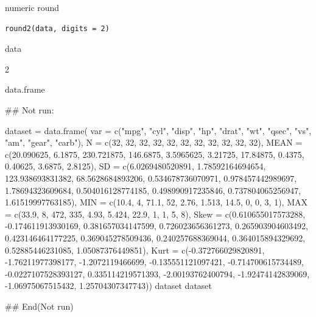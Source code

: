 \documentclass[a4paper]{book}
\begin{document}
%
\begin{Description}
numeric round
\end{Description}
%
\begin{Usage}
\begin{verbatim}
round2(data, digits = 2)
\end{verbatim}
\end{Usage}
%
\begin{Arguments}
\begin{ldescription}
\item[\code{data}] data

\item[\code{digits}] 2
\end{ldescription}
\end{Arguments}
%
\begin{Value}
data.frame
\end{Value}
%
\begin{Examples}
\begin{ExampleCode}

\#\# Not run: 

dataset = data.frame(
var = c("mpg", "cyl", "disp", "hp",
"drat", "wt", "qsec", "vs", "am",
"gear", "carb"),
N = c(32, 32, 32, 32, 32, 32, 32,
 32, 32, 32, 32),
MEAN = c(20.090625, 6.1875, 230.721875,
 146.6875, 3.5965625, 3.21725, 17.84875,
 0.4375, 0.40625, 3.6875, 2.8125),
SD = c(6.0269480520891, 1.78592164694654,
 123.938693831382, 68.5628684893206,
  0.534678736070971, 0.978457442989697,
  1.78694323609684, 0.504016128774185,
   0.498990917235846, 0.737804065256947,
    1.61519997763185),
MIN = c(10.4, 4, 71.1, 52, 2.76,
1.513, 14.5, 0, 0, 3, 1),
MAX = c(33.9, 8, 472, 335, 4.93,
5.424, 22.9, 1, 1, 5, 8),
Skew = c(0.610655017573288, -0.174611913930169,
 0.381657034147599, 0.726023656361273,
 0.265903904603492, 0.423146464177225,
 0.369045278509436, 0.240257688369044,
  0.364015894329692, 0.52885446231085, 1.05087376449851),
Kurt = c(-0.372766029820891, -1.76211977398177,
 -1.2072119466699, -0.135551121097421,
 -0.714700615734489, -0.0227107528393127,
 0.335114219571393, -2.00193762400794,
 -1.92474142839069, -1.06975067515432,
  1.25704307347743))
dataset
dataset%



## End(Not run)


\end{ExampleCode}
\end{Examples}
\end{document}
